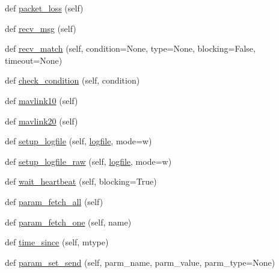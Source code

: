 \begin{DoxyCompactItemize}
\item 
def \mbox{\hyperlink{classpymavlink_1_1mavutil_1_1mavfile_abb4396fef91c8b5768ed865dd441286f}{packet\+\_\+loss}} (self)
\item 
def \mbox{\hyperlink{classpymavlink_1_1mavutil_1_1mavfile_acf32945bf305666d12d8a1bf32ae6893}{recv\+\_\+msg}} (self)
\item 
def \mbox{\hyperlink{classpymavlink_1_1mavutil_1_1mavfile_a7baa4911cf9de819dc682f2904bf4352}{recv\+\_\+match}} (self, condition=None, type=None, blocking=False, timeout=None)
\item 
def \mbox{\hyperlink{classpymavlink_1_1mavutil_1_1mavfile_a8875f5c51e7b332f252af3b6b19fcf23}{check\+\_\+condition}} (self, condition)
\item 
def \mbox{\hyperlink{classpymavlink_1_1mavutil_1_1mavfile_a2539d7b34226d566b9167f4c0bc5d7a4}{mavlink10}} (self)
\item 
def \mbox{\hyperlink{classpymavlink_1_1mavutil_1_1mavfile_a84eb9bd740dd761537c4fc16d0c436b7}{mavlink20}} (self)
\item 
def \mbox{\hyperlink{classpymavlink_1_1mavutil_1_1mavfile_a3cae7386bd175b00f8ab23316165f47a}{setup\+\_\+logfile}} (self, \mbox{\hyperlink{classpymavlink_1_1mavutil_1_1mavfile_a173adae978d36daed8740caaf561200d}{logfile}}, mode=\textquotesingle{}w\textquotesingle{})
\item 
def \mbox{\hyperlink{classpymavlink_1_1mavutil_1_1mavfile_af8bde63a7c980d24fd1679dca36242bf}{setup\+\_\+logfile\+\_\+raw}} (self, \mbox{\hyperlink{classpymavlink_1_1mavutil_1_1mavfile_a173adae978d36daed8740caaf561200d}{logfile}}, mode=\textquotesingle{}w\textquotesingle{})
\item 
def \mbox{\hyperlink{classpymavlink_1_1mavutil_1_1mavfile_a3776d63929d3183a65076cda4930b624}{wait\+\_\+heartbeat}} (self, blocking=True)
\item 
def \mbox{\hyperlink{classpymavlink_1_1mavutil_1_1mavfile_a5337d04307871f7ac873a17eb24b3180}{param\+\_\+fetch\+\_\+all}} (self)
\item 
def \mbox{\hyperlink{classpymavlink_1_1mavutil_1_1mavfile_a37e35b77e1bba0d32ec8ff37b79b0e23}{param\+\_\+fetch\+\_\+one}} (self, name)
\item 
def \mbox{\hyperlink{classpymavlink_1_1mavutil_1_1mavfile_a7749c322285d3e6c03f20b9f5931a9ba}{time\+\_\+since}} (self, mtype)
\item 
def \mbox{\hyperlink{classpymavlink_1_1mavutil_1_1mavfile_a28ff487ffd14ae2366c6dbc65f2c8612}{param\+\_\+set\+\_\+send}} (self, parm\+\_\+name, parm\+\_\+value, parm\+\_\+type=None)

\end{DoxyCompactItemize}
